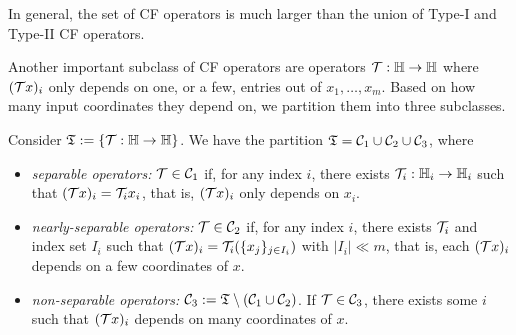 In general, the set of CF operators is much larger than the union of Type-I and Type-II CF operators.

Another important subclass of CF operators are operators ${\mathcal{T}}:\mathbb{H}\to\mathbb{H}$ where   $({\mathcal{T}} x)_i$ only depends on one, or a few, entries out of $x_1,\ldots,x_m$. Based on how many input coordinates they depend on, we partition them into three subclasses.
 \DIFdelbegin %

\DIFdelend \begin{definition}\label{def:sep-op} Consider $\mathfrak{T}:=\{{\mathcal{T}}:\mathbb{H}\to\mathbb{H}\}$. We have the partition $\mathfrak{T}={\mathcal{C}}_1\cup{\mathcal{C}}_2\cup{\mathcal{C}}_3$, where
\begin{itemize}
\item \emph{separable operators:} ${\mathcal{T}}\in{\mathcal{C}}_1$ if, for any index $i$, there exists ${\mathcal{T}}_i: \mathbb{H}_i \rightarrow \mathbb{H}_i$ such that $({\mathcal{T}} x)_i = {\mathcal{T}}_i x_i$, that is,   $({\mathcal{T}} x)_i$ only depends on $x_i$.
\item \emph{nearly-separable operators:} ${\mathcal{T}}\in {\mathcal{C}}_2$ if, for any index $i$, there exists ${\mathcal{T}}_i$ and index set $I_i$ such that $({\mathcal{T}} x)_i = {\mathcal{T}}_i(\{x_j\}_{j\in I_i})$ with $|I_i| \ll m$, that is, each $({\mathcal{T}} x)_i$ depends on a few  coordinates of $x$.
\item \emph{non-separable operators:} ${\mathcal{C}}_3:=\mathfrak{T}\setminus({\mathcal{C}}_1\cup {\mathcal{C}}_2)$. If ${\mathcal{T}}\in{\mathcal{C}}_3$, there exists some  $i$ such that $({\mathcal{T}} x)_i$ depends on many coordinates of $x$.
\end{itemize}
\end{definition}


